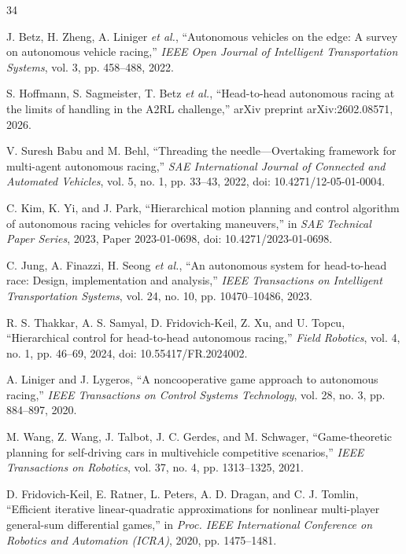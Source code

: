 \documentclass[journal,twoside,web]{ieeecolor}
\begin{document}
\begin{thebibliography}{34}

J. Betz, H. Zheng, A. Liniger \emph{et al.},
``Autonomous vehicles on the edge: A survey on autonomous vehicle racing,''
\emph{IEEE Open Journal of Intelligent Transportation Systems}, vol. 3,
pp. 458--488, 2022.

S. Hoffmann, S. Sagmeister, T. Betz \emph{et al.},
``Head-to-head autonomous racing at the limits of handling in the A2RL
challenge,'' arXiv preprint arXiv:2602.08571, 2026.

V. Suresh Babu and M. Behl,
``Threading the needle---Overtaking framework for multi-agent autonomous
racing,'' \emph{SAE International Journal of Connected and Automated
Vehicles}, vol. 5, no. 1, pp. 33--43, 2022,
doi: 10.4271/12-05-01-0004.

C. Kim, K. Yi, and J. Park,
``Hierarchical motion planning and control algorithm of autonomous racing
vehicles for overtaking maneuvers,'' in \emph{SAE Technical Paper Series},
2023, Paper 2023-01-0698, doi: 10.4271/2023-01-0698.

C. Jung, A. Finazzi, H. Seong \emph{et al.},
``An autonomous system for head-to-head race: Design, implementation and
analysis,'' \emph{IEEE Transactions on Intelligent Transportation Systems},
vol. 24, no. 10, pp. 10470--10486, 2023.

R. S. Thakkar, A. S. Samyal, D. Fridovich-Keil, Z. Xu, and U. Topcu,
``Hierarchical control for head-to-head autonomous racing,''
\emph{Field Robotics}, vol. 4, no. 1, pp. 46--69, 2024,
doi: 10.55417/FR.2024002.

A. Liniger and J. Lygeros,
``A noncooperative game approach to autonomous racing,''
\emph{IEEE Transactions on Control Systems Technology}, vol. 28, no. 3,
pp. 884--897, 2020.

M. Wang, Z. Wang, J. Talbot, J. C. Gerdes, and M. Schwager,
``Game-theoretic planning for self-driving cars in multivehicle competitive
scenarios,'' \emph{IEEE Transactions on Robotics}, vol. 37, no. 4,
pp. 1313--1325, 2021.

D. Fridovich-Keil, E. Ratner, L. Peters, A. D. Dragan, and C. J. Tomlin,
``Efficient iterative linear-quadratic approximations for nonlinear
multi-player general-sum differential games,'' in \emph{Proc. IEEE
International Conference on Robotics and Automation (ICRA)}, 2020,
pp. 1475--1481.


\end{thebibliography}
\end{document}
